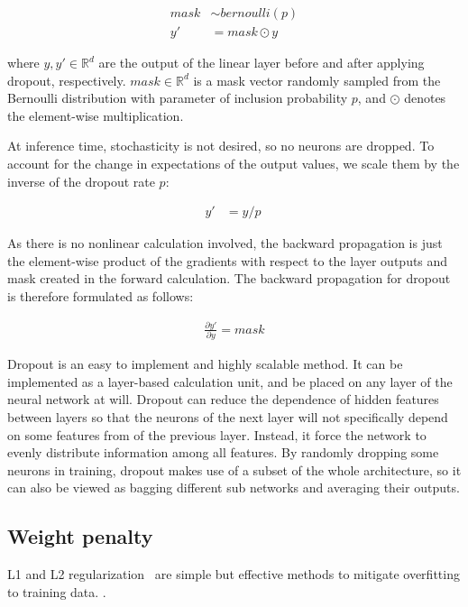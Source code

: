 \documentclass{article}
\begin{document}
\begin{align}
    mask & \sim bernoulli(p) \\
    y'   & = mask \odot y\
\end{align}

where $y, y' \in \mathbb{R}^d$ are the output of the linear layer
before and after applying dropout,
respectively. $mask \in \mathbb{R}^d$ is a mask vector randomly sampled from the
Bernoulli distribution with parameter of inclusion probability
$p$, and $\odot$ denotes the element-wise multiplication.

At inference time, stochasticity is not desired, so no neurons
are dropped. To account for the change in expectations of the
output values, we scale them by the inverse of the dropout rate
$p$:

\begin{align}
    y' & = y/p\
\end{align}

As there is no nonlinear calculation involved, the backward
propagation is just the element-wise product of the gradients
with respect to the layer outputs and mask created
in the forward calculation. The backward propagation for
dropout is therefore formulated as follows:

\begin{align}
    \frac{\partial y'}{\partial y} = mask
\end{align}

Dropout is an easy to implement and highly scalable
method. It can be implemented as a layer-based calculation
unit, and be placed on any layer of the neural network at
will. Dropout can reduce the dependence of hidden features
between layers so that the neurons of the next layer will not
specifically depend on some features from of the previous layer.
Instead, it force the network to evenly distribute information
among all features. By randomly dropping some neurons in training,
dropout makes use of a subset of the whole architecture, so it can
also be viewed as bagging different sub networks and averaging their
outputs.



\subsection{Weight penalty}

L1 and L2 regularization~\cite{ng2004feature} are simple but effective
methods to mitigate overfitting to training data.
\questionThirteen.
\end{document}
